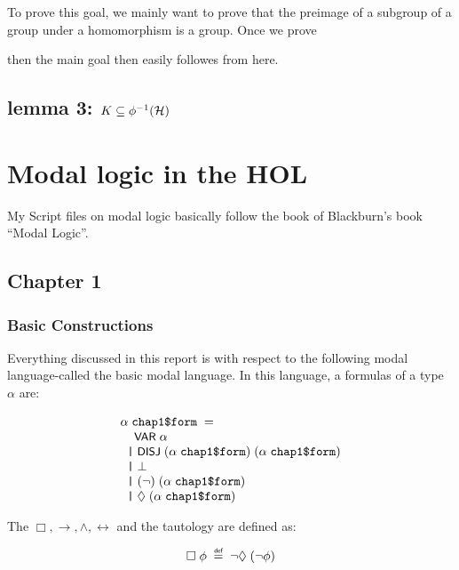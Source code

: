 \documentclass[letterpaper]{article}
\renewcommand{\HOLConst}[1]{{\textsf{\upshape\small #1}}}
\newenvironment{holmath}{\begin{displaymath}\begin{array}{l}}{\end{array}\end{displaymath}\ignorespacesafterend}
\begin{document}
To prove this goal, we mainly want to prove that the preimage of a subgroup of a group under a homomorphism is a group. Once we prove

then the main goal then easily followes from here.

\subsection{lemma 3: $K\subseteq\phi^{-1}({\cal H})$}

\section{Modal logic in the HOL}

My Script files on modal logic basically follow the book of Blackburn's book ``Modal Logic''.

\subsection{Chapter 1}
\subsubsection{Basic Constructions}

Everything discussed in this report is with respect to the following modal language-called the basic modal language. In this language, a formulas of a type $\alpha$ are:

\begin{holmath}
\ensuremath{\alpha}\;\HOLTyOp{chap1\$form}\;=\\
\;\;\;\;\HOLConst{VAR}\;\ensuremath{\alpha}\\
\;\;\HOLTokenBar{}\;\HOLConst{DISJ}\;(\ensuremath{\alpha}\;\HOLTyOp{chap1\$form})\;(\ensuremath{\alpha}\;\HOLTyOp{chap1\$form})\\
\;\;\HOLTokenBar{}\;\HOLSymConst{\ensuremath{\bot}}\\
\;\;\HOLTokenBar{}\;(\HOLSymConst{\HOLTokenNeg{}})\;(\ensuremath{\alpha}\;\HOLTyOp{chap1\$form})\\
\;\;\HOLTokenBar{}\;\HOLSymConst{\ensuremath{\Diamond}}\;(\ensuremath{\alpha}\;\HOLTyOp{chap1\$form})
\end{holmath}

The $\Box,\rightarrow,\land,\leftrightarrow$ and the tautology are defined as:

\begin{holmath}
  \HOLSymConst{\ensuremath{\Box}}\;\HOLFreeVar{\ensuremath{\phi}}\;\HOLSymConst{\HOLTokenDefEquality{}}\;\HOLSymConst{\HOLTokenNeg{}}\HOLSymConst{\ensuremath{\Diamond}}\;(\HOLSymConst{\HOLTokenNeg{}}\HOLFreeVar{\ensuremath{\phi}})
\end{holmath}
\end{document}
